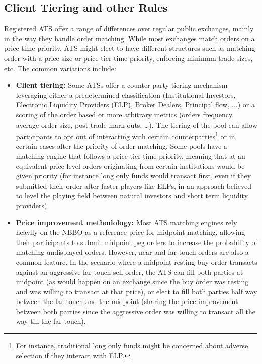 \subsection{Client Tiering and other Rules\label{sec:client_tier}}

Registered ATS offer a range of differences over regular public exchanges, mainly in the way they handle order matching. While most exchanges match orders on a price-time priority, ATS might elect to have different structures such as matching order with a price-size or price-tier-time priority, enforcing minimum trade sizes, etc. The common variations include:


\begin{itemize}
\item{\textbf{Client tiering:}}\label{in:client_t1} Some ATSs offer a counter-party tiering mechanism leveraging either a predetermined classification (Institutional Investors, Electronic Liquidity Providers (ELP), Broker Dealers, Principal flow, ...) or a scoring of the order based or more arbitrary metrics (orders frequency, average order size, post-trade mark outs, \dots). The tiering of the pool can allow participants to opt out of interacting with certain counterparties\footnote{For instance, traditional long only funds might be concerned about adverse selection if they interact with ELP.} or in certain cases alter the priority of order matching. Some pools have a matching engine that follows a price-tier-time priority, meaning that at an equivalent price level orders originating from certain institutions would be given priority (for instance long only funds would transact first, even if they submitted their order after faster players like ELPs, in an approach believed to level the playing field between natural investors and short term liquidity providers). \label{in:client_t2}

\item{\textbf{Price improvement methodology:}} Most ATS matching engines rely heavily on the NBBO as a reference price for midpoint matching, allowing their participants to submit midpoint peg orders to increase the probability of matching undisplayed orders. However, near and far touch orders are also a common feature. In the scenario where a midpoint resting buy order transacts against an aggressive far touch sell order, the ATS can fill both parties at midpoint (as would happen on an exchange since the buy order was resting and was willing to transact at that price), or elect to fill both parties half way between the far touch and the midpoint (sharing the price improvement between both parties since the aggressive order was willing to transact all the way till the far touch). 


\end{itemize}

